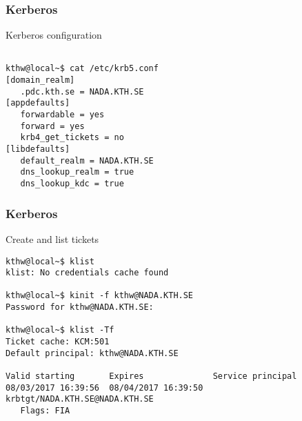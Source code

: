 
\begin{frame}[fragile]
  \frametitle{Kerberos}
  \begin{alertblock}{Kerberos configuration}
    \verbatimfont{\footnotesize}
    \begin{verbatim}

kthw@local~$ cat /etc/krb5.conf
[domain_realm]
   .pdc.kth.se = NADA.KTH.SE
[appdefaults]
   forwardable = yes
   forward = yes
   krb4_get_tickets = no
[libdefaults]
   default_realm = NADA.KTH.SE
   dns_lookup_realm = true
   dns_lookup_kdc = true

 \end{verbatim}
\end{alertblock}

\end{frame}



\begin{frame}[fragile]
  \frametitle{Kerberos}
  \begin{alertblock}{Create and list tickets}
    \verbatimfont{\footnotesize}
    \begin{verbatim}
kthw@local~$ klist
klist: No credentials cache found
      
kthw@local~$ kinit -f kthw@NADA.KTH.SE
Password for kthw@NADA.KTH.SE:

kthw@local~$ klist -Tf  
Ticket cache: KCM:501
Default principal: kthw@NADA.KTH.SE

Valid starting       Expires              Service principal
08/03/2017 16:39:56  08/04/2017 16:39:50  krbtgt/NADA.KTH.SE@NADA.KTH.SE
   Flags: FIA

  \end{verbatim}
  \end{alertblock}

\end{frame}




